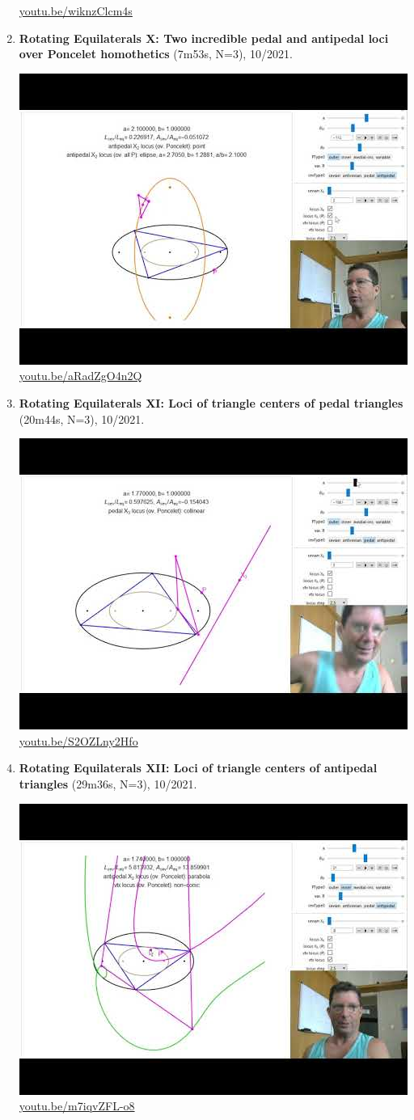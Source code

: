 \documentclass[12pt]{amsart}
\begin{document}
\begin{enumerate}[resume]
\begin{center}
\href{https://youtu.be/wiknzClcm4s}{\url{youtu.be/wiknzClcm4s}}\end{center}
% 
\item \textbf{Rotating Equilaterals X: Two incredible pedal and antipedal loci over Poncelet homothetics} (7m53s, N=3), 10/2021. 
\begin{center}\includegraphics[width=.5\textwidth]{pics/aRadZgO4n2Q.jpg} \\ 
\href{https://youtu.be/aRadZgO4n2Q}{\url{youtu.be/aRadZgO4n2Q}}\end{center}
% 
\item \textbf{Rotating Equilaterals XI: Loci of triangle centers of pedal triangles} (20m44s, N=3), 10/2021. 
\begin{center}\includegraphics[width=.5\textwidth]{pics/S2OZLny2Hfo.jpg} \\ 
\href{https://youtu.be/S2OZLny2Hfo}{\url{youtu.be/S2OZLny2Hfo}}\end{center}
% 
\item \textbf{Rotating Equilaterals XII: Loci of triangle centers of antipedal triangles} (29m36s, N=3), 10/2021. 
\begin{center}\includegraphics[width=.5\textwidth]{pics/m7iqvZFL-o8.jpg} \\ 
\href{https://youtu.be/m7iqvZFL-o8}{\url{youtu.be/m7iqvZFL-o8}}\end{center}
% 
\end{enumerate}
\end{document}
